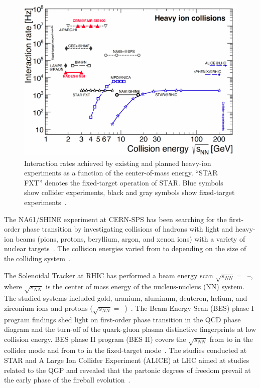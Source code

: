 \begin{figure}[!h]
    \centering
    \includegraphics[width=0.7\columnwidth]{Chapter1/images/interaction_rates.png}
    \caption{Interaction rates achieved by existing and planned heavy-ion experiments as a function of the center-of-mass energy. “STAR FXT” denotes the fixed-target operation of STAR.  Blue symbols show collider experiments, black and gray symbols show fixed-target experiments~\cite{Ablyazimov_2017}.}
    \label{fig:cbm_rates}
\end{figure}

The NA61/SHINE experiment at CERN-SPS has been searching for the first-order phase transition by investigating collisions of hadrons with light and heavy-ion beams (pions, protons, beryllium, argon, and xenon ions) with a variety of nuclear targets~\cite{CBM_physics, Turko:2301677}. The collision energies varied from  to  depending on the size of the colliding system~\cite{na61energy}. 

The Solenoidal Tracker at \gls{RHIC} has
performed a beam energy scan $\sqrt{s_{NN}} =$~--, where $\sqrt{s_{NN}}$ is the center of mass energy of the nucleus-nucleus (NN) system. The studied systems included gold, uranium, aluminum, deuteron, helium, and zirconium ions and protons ($\sqrt{s_{NN}}=$~)~\cite{Stefaniak:2022dxo}. The Beam Energy Scan (\gls{BES}) phase I program findings shed light on first-order phase transition in the QCD phase diagram and the turn-off of the quark-gluon plasma distinctive fingerprints at low collision energy. BES phase II program (BES II) covers the $\sqrt{s_{NN}}$ from  to  in the collider mode and from  to  in the fixed-target mode~\cite{STAR2, STAR1}.
The studies conducted at \gls{STAR} and A Large Ion Collider Experiment (\gls{ALICE}) at \gls{LHC} aimed at studies related to the \gls{QGP} and revealed that the partonic degrees of freedom prevail at the early phase of the fireball evolution~\cite{CBM_physics}.


